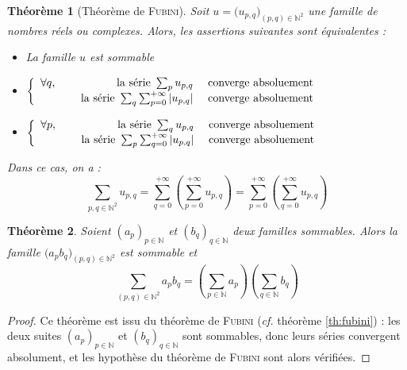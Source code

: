 \documentclass[11pt,a4paper]{report}
\newtheorem{theorem}{Théorème}[chapter]
\newtheorem{itheorem}[theorem]{Théorème}
\theoremstyle{definition}
\begin{document}
\begin{itheorem}[Théorème de \textsc{Fubini}]
     Soit $u = \Big( u_{p,q}\Big)_{(p,q)\in \mathbb{N}^2} $ une famille de nombres réels ou complexes. Alors, les assertions suivantes sont équivalentes : 
     \begin{itemize}
         \item La famille $u$ est sommable
         \item $ 
         \displaystyle\left\lbrace \begin{array}{r r l}
              \forall q,\quad& \text{ la série } \sum_p u_{p,q} & \text{ converge absoluement}\\
              &\text{ la série } \sum_q \sum_{p=0}^{+\infty} | u_{p,q} | & \text{ converge absoluement}
         \end{array}\right.
          $
          \item $
         \displaystyle\left\lbrace \begin{array}{r r l}
              \forall p,\quad& \text{ la série } \sum_q u_{p,q} & \text{ converge absoluement}\\
              &\text{ la série } \sum_p \sum_{q=0}^{+\infty} | u_{p,q} | & \text{ converge absoluement}
         \end{array}\right.
          $
     \end{itemize}
     Dans ce cas, on a : 
     \begin{equation}
     \sum_{p,q\in \mathbb{N}^2} u_{p,q} = \sum_{q=0}^{+\infty} \left( \sum_{p=0}^{+\infty} u_{p,q} \right) = \sum_{p=0}^{+\infty} \left( \sum_{q=0}^{+\infty} u_{p,q} \right) 
     \end{equation}
     
\end{itheorem}
\begin{theorem}
     Soient $(a_p)_{p\in \mathbb{N}}$ et $(b_q)_{q\in \mathbb{N}}$ deux familles sommables. Alors la famille $\big( a_p b_q\big)_{(p,q)\in \mathbb{N}^2}$ est sommable et 
     \begin{equation}
     \sum_{(p,q)\in \mathbb{N}^2} a_p b_q= \left( \sum_{p\in \mathbb{N}} a_p \right) \left( \sum_{q\in \mathbb{N}} b_q \right)
     \end{equation}
\end{theorem}
\begin{proof}
     Ce théorème est issu du théorème de \textsc{Fubini} (\textit{cf.} théorème \ref{th:fubini}) : les deux suites $(a_p)_{p\in \mathbb{N}}$ et $(b_q)_{q\in \mathbb{N}}$ sont sommables, donc leurs séries convergent absolument, et les hypothèse du théorème de \textsc{Fubini} sont alors vérifiées.
\end{proof}
\end{document}
